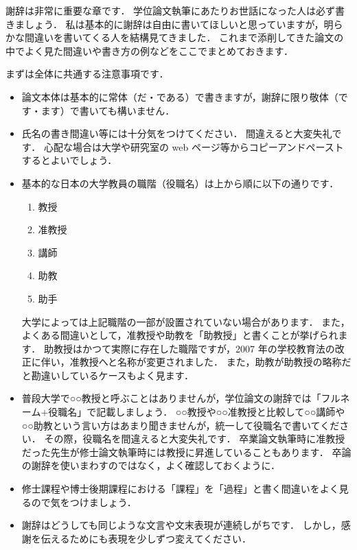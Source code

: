 \acknowledge

謝辞は非常に重要な章です．
学位論文執筆にあたりお世話になった人は必ず書きましょう．
私は基本的に謝辞は自由に書いてほしいと思っていますが，明らかな間違いを書いてくる人を結構見てきました．
これまで添削してきた論文の中でよく見た間違いや書き方の例などをここでまとめておきます．

まずは全体に共通する注意事項です．
\begin{itemize}
    \item 論文本体は基本的に常体（だ・である）で書きますが，謝辞に限り敬体（です・ます）で書いても構いません．
    \item 氏名の書き間違い等には十分気をつけてください．
    間違えると大変失礼です．
    心配な場合は大学や研究室の web ページ等からコピーアンドペーストするとよいでしょう．
    \item 基本的な日本の大学教員の職階（役職名）は上から順に以下の通りです．
    \begin{enumerate}
        \item 教授
        \item 准教授
        \item 講師
        \item 助教
        \item 助手
    \end{enumerate}
    大学によっては上記職階の一部が設置されていない場合があります．
    また，よくある間違いとして，准教授や助教を「助教授」と書くことが挙げられます．
    助教授はかつて実際に存在した職階ですが，2007 年の学校教育法の改正に伴い，准教授へと名称が変更されました．
    また，助教が助教授の略称だと勘違いしているケースもよく見ます．
    \item 普段大学で○○教授と呼ぶことはありませんが，学位論文の謝辞では「フルネーム$+$役職名」で記載しましょう．
    ○○教授や○○准教授と比較して○○講師や○○助教という言い方はあまり聞きませんが，統一して役職名で書いてください．
    その際，役職名を間違えると大変失礼です．
    卒業論文執筆時に准教授だった先生が修士論文執筆時には教授に昇進していることもあります．
    卒論の謝辞を使いまわすのではなく，よく確認しておくように．
    \item 修士課程や博士後期課程における「課程」を「過程」と書く間違いをよく見るので気をつけましょう．
    \item 謝辞はどうしても同じような文言や文末表現が連続しがちです．
    しかし，感謝を伝えるためにも表現を少しずつ変えてください．
\end{itemize}

